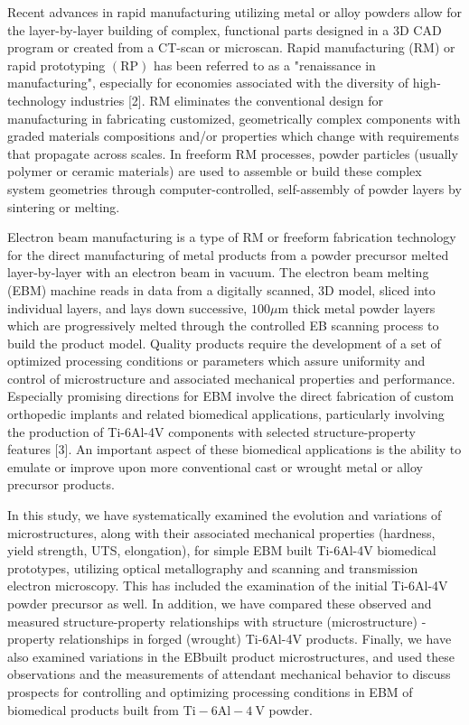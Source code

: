 \documentclass[10pt]{article}
\begin{document}
Recent advances in rapid manufacturing utilizing metal or alloy powders allow for the layer-by-layer building of complex, functional parts designed in a 3D CAD program or created from a CT-scan or microscan. Rapid manufacturing (RM) or rapid prototyping $(\mathrm{RP})$ has been referred to as a "renaissance in manufacturing", especially for economies associated with the diversity of high-technology industries [2]. RM eliminates the conventional design for manufacturing in fabricating customized, geometrically complex components with graded materials compositions and/or properties which change with requirements that propagate across scales. In freeform RM processes, powder particles (usually polymer or ceramic materials) are used to assemble or build these complex system geometries through computer-controlled, self-assembly of powder layers by sintering or melting.

Electron beam manufacturing is a type of RM or freeform fabrication technology for the direct manufacturing of metal products from a powder precursor melted layer-by-layer with an electron beam in vacuum. The electron beam melting (EBM) machine reads in data from a digitally scanned, 3D model, sliced into individual layers, and lays down successive, $100 \mu \mathrm{m}$ thick metal powder layers which are progressively melted through the controlled EB scanning process to build the product model. Quality products require the development of a set of optimized processing conditions or parameters which assure uniformity and control of microstructure and associated mechanical properties and performance. Especially promising directions for EBM involve the direct fabrication of custom orthopedic implants and related biomedical applications, particularly involving the production of Ti-6Al-4V components with selected structure-property features [3]. An important aspect of these biomedical applications is the ability to emulate or improve upon more conventional cast or wrought metal or alloy precursor products.

In this study, we have systematically examined the evolution and variations of microstructures, along with their associated mechanical properties (hardness, yield strength, UTS, elongation), for simple EBM built Ti-6Al-4V biomedical prototypes, utilizing optical metallography and scanning and transmission electron microscopy. This has included the examination of the initial Ti-6Al-4V powder precursor as well. In addition, we have compared these observed and measured structure-property relationships with structure (microstructure) - property relationships in forged (wrought) Ti-6Al-4V products. Finally, we have also examined variations in the EBbuilt product microstructures, and used these observations and the measurements of attendant mechanical behavior to discuss prospects for controlling and optimizing processing conditions in EBM of biomedical products built from $\mathrm{Ti}-6 \mathrm{Al}-4 \mathrm{~V}$ powder.
\end{document}
